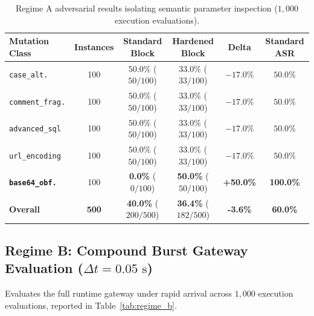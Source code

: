 \documentclass[10pt,twocolumn,letterpaper]{article}
\begin{document}
\begin{table}[h]
\centering
\scriptsize
\caption{Regime A adversarial results isolating semantic parameter inspection ($1{,}000$ execution evaluations).}
\label{tab:regime_a}
\begin{tabular}{lccccc}
\toprule
\textbf{Mutation Class} & \textbf{Instances} & \textbf{Standard Block} & \textbf{Hardened Block} & \textbf{Delta} & \textbf{Standard ASR} \\
\midrule
\texttt{case\_alt.} & 100 & $50.0\%$ ($50/100$) & $33.0\%$ ($33/100$) & $-17.0\%$ & $50.0\%$ \\
\texttt{comment\_frag.} & 100 & $50.0\%$ ($50/100$) & $33.0\%$ ($33/100$) & $-17.0\%$ & $50.0\%$ \\
\texttt{advanced\_sql} & 100 & $50.0\%$ ($50/100$) & $33.0\%$ ($33/100$) & $-17.0\%$ & $50.0\%$ \\
\texttt{url\_encoding} & 100 & $50.0\%$ ($50/100$) & $33.0\%$ ($33/100$) & $-17.0\%$ & $50.0\%$ \\
\textbf{\texttt{base64\_obf.}} & 100 & \textbf{0.0\%} ($0/100$) & \textbf{50.0\%} ($50/100$) & \textbf{+50.0\%} & \textbf{100.0\%} \\
\midrule
\textbf{Overall} & \textbf{500} & \textbf{40.0\%} ($200/500$) & \textbf{36.4\%} ($182/500$) & \textbf{-3.6\%} & \textbf{60.0\%} \\
\bottomrule
\end{tabular}
\end{table}

\subsection{Regime B: Compound Burst Gateway Evaluation ($\Delta t = 0.05\text{ s}$)}
Evaluates the full runtime gateway under rapid arrival across $1{,}000$ execution evaluations, reported in Table~\ref{tab:regime_b}.
\end{document}
